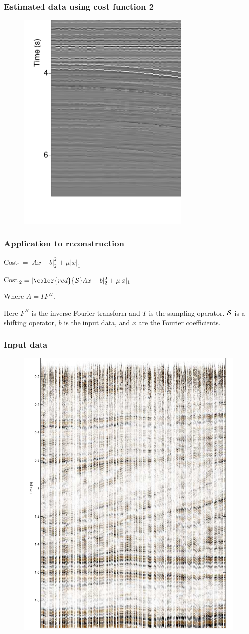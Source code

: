 \begin{frame} \frametitle{Estimated data using cost function 2}
\begin{figure}[t]
\centering
\includegraphics[width=0.75\textwidth,height=0.5\textwidth,keepaspectratio=false]{syn5d/Fig/estimated_data_with_statics.pdf}
\end{figure}
\end{frame}

\begin{frame} \frametitle{Application to reconstruction}
    \Large{Cost$_1 = |Ax-b|^2_2 + \mu|x|_1 $}

\bigskip
    \Large{Cost$_2 = |{\color{red}{\cal{S}}}Ax-b|^2_2 + \mu|x|_1 $}

\bigskip

Where $A=TF^H$. 

Here $F^H$ is the inverse Fourier transform and $T$ is the sampling operator. ${\cal{S}}$ is a shifting operator, $b$ is the input data, and $x$ are the Fourier coefficients.

\end{frame}


\begin{frame} \frametitle{Input data\\}
\begin{figure}[t]
\centering
\includegraphics[width=1\textwidth,height=0.5\textwidth,keepaspectratio=false]{syn5d/Fig/image_d_stat.pdf}
\end{figure}
\end{frame}

